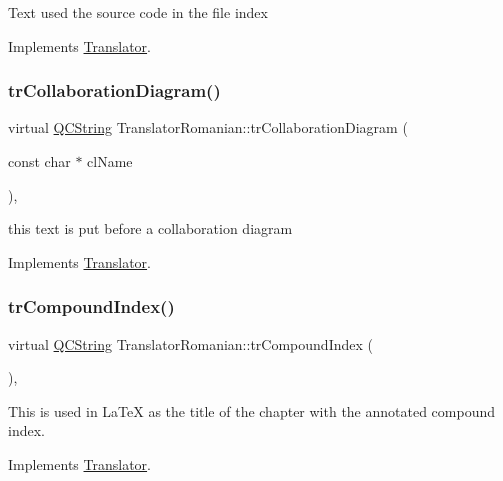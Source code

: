 Text used the source code in the file index 

Implements \mbox{\hyperlink{class_translator}{Translator}}.

\mbox{\label{class_translator_romanian_a9090b5a9bb75b219f41af32bb0a2e026}} 
\subsubsection{\texorpdfstring{trCollaborationDiagram()}{trCollaborationDiagram()}}
{\footnotesize\ttfamily virtual \mbox{\hyperlink{class_q_c_string}{Q\+C\+String}} Translator\+Romanian\+::tr\+Collaboration\+Diagram (\begin{DoxyParamCaption}\item[{const char $\ast$}]{cl\+Name }\end{DoxyParamCaption})\hspace{0.3cm}{\ttfamily [inline]}, {\ttfamily [virtual]}}

this text is put before a collaboration diagram 

Implements \mbox{\hyperlink{class_translator}{Translator}}.

\mbox{\label{class_translator_romanian_a34e56e7e779880b7282a8bf9cb392d1c}} 
\subsubsection{\texorpdfstring{trCompoundIndex()}{trCompoundIndex()}}
{\footnotesize\ttfamily virtual \mbox{\hyperlink{class_q_c_string}{Q\+C\+String}} Translator\+Romanian\+::tr\+Compound\+Index (\begin{DoxyParamCaption}{ }\end{DoxyParamCaption})\hspace{0.3cm}{\ttfamily [inline]}, {\ttfamily [virtual]}}

This is used in La\+TeX as the title of the chapter with the annotated compound index. 

Implements \mbox{\hyperlink{class_translator}{Translator}}.

